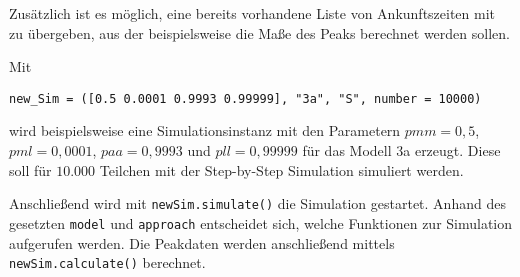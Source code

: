 Zusätzlich ist es möglich, eine bereits vorhandene Liste von Ankunftszeiten mit zu übergeben, aus der beispielsweise die Maße des Peaks berechnet werden sollen.

Mit \begin{verbatim}
new_Sim = ([0.5 0.0001 0.9993 0.99999], "3a", "S", number = 10000)
\end{verbatim} 
wird beispielsweise eine Simulationsinstanz mit den Parametern $pmm = 0,5$, $pml = 0,0001$, $paa = 0,9993$ und $pll = 0,99999$ für das Modell 3a erzeugt. Diese soll für $10.000$ Teilchen mit der Step-by-Step Simulation simuliert werden.

Anschließend wird mit \verb!newSim.simulate()! die Simulation gestartet. Anhand des gesetzten \verb!model! und \verb!approach! entscheidet sich, welche Funktionen zur Simulation aufgerufen werden. Die Peakdaten werden anschließend mittels \verb!newSim.calculate()! berechnet.

